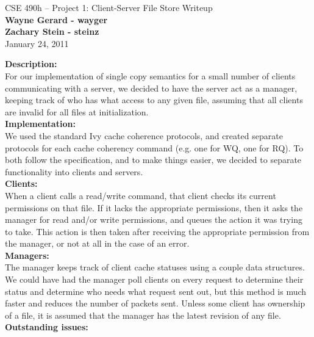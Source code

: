 \documentclass[11pt]{article}
\begin{document}
\begin{center}
{\large CSE 490h -- Project 1: Client-Server File Store Writeup} \\
\textbf{Wayne Gerard - wayger} \\
\textbf{Zachary Stein - steinz} \\
January 24, 2011
\end{center}

\textbf{Description:} \\

For our implementation of single copy semantics for a small number of clients communicating with a server, we decided to have the server act as a manager, 
keeping track of who has what access to any given file, assuming that all clients are invalid for all files at initialization.\\

\textbf{Implementation:} \\

We used the standard Ivy cache coherence protocols, and created separate protocols for each cache coherency command (e.g. one for WQ, one for RQ). 
To both follow the specification, and to make things easier, we decided to separate functionality into clients and servers. \\

\textbf{Clients:} \\

When a client calls a read/write command, that client checks its current permissions on that file. If it lacks the appropriate permissions, then it asks the 
manager for read and/or write permissions, and queues the action it was trying to take. This action is then taken after receiving the appropriate 
permission from the manager, or not at all in the case of an error. \\

\textbf{Managers:} \\ 

The manager keeps track of client cache statuses using a couple data structures. We could have had the manager poll clients on every request to 
determine their status and determine who needs what request sent out, but this method is much faster and reduces the number of packets sent. Unless some
client has ownership of a file, it is assumed that the manager has the latest revision of any file.\\

\textbf{Outstanding issues:} \\
\end{document}
